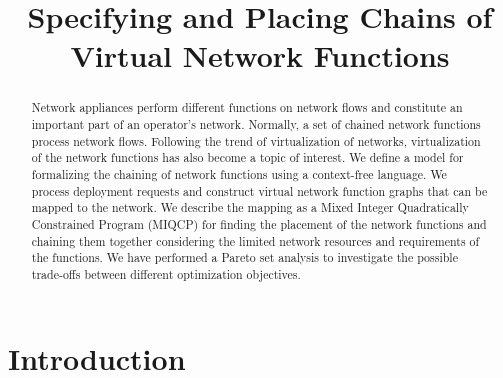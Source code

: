 \documentclass[10pt,a4paper,conference]{IEEEtran}
\begin{document}
\title{Specifying and Placing Chains of\\ Virtual Network Functions\vspace{-8mm}}



\author{
\and 
{}
\and
{}
}

\maketitle


\begin{abstract}
Network appliances perform different functions on network flows and constitute an 
important part of an operator's network. Normally, a set of chained network functions
process network flows. Following the trend of virtualization of networks, 
virtualization of the network functions has also become a topic of interest.  
We define a model for formalizing the chaining of network functions using a 
context-free language. We process deployment requests and construct virtual
network function graphs that can be mapped to the network. We describe the mapping as a Mixed 
Integer Quadratically Constrained Program (MIQCP) for finding the placement of 
the network functions and chaining them together considering the limited network resources 
and requirements of the functions. We have performed a Pareto set analysis to 
investigate the possible trade-offs between different optimization objectives.
\end{abstract}

\IEEEpeerreviewmaketitle

\section{Introduction}
\label{sec:introduction}
\acresetall
\end{document}
